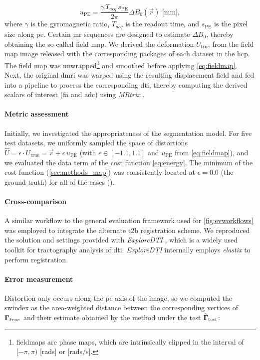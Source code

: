   \begin{equation}
  u_\text{PE} = \frac{\gamma \, T_{acq}\, s_\text{PE}}{2\pi}\Delta B_0(\vec{r})\text{ [mm]},
  \label{eq:fieldmap}
  \end{equation}
where $\gamma$ is the gyromagnetic ratio, $T_{acq}$ is the readout time, and
  $s_\text{PE}$ is the pixel size along \gls*{pe}.
Certain \gls*{mr} sequences are designed to estimate $\Delta B_0$, thereby obtaining
  the so-called field map.
We derived the deformation $U_\text{true}$ from the field map image released with
  the corresponding packages of each dataset in the \gls*{hcp}.
The field map was unwrapped\footnote{fieldmaps are phase maps, which are intrinsically clipped in the interval
  of $[-\pi, \pi)$ [rads] or [rads/s].} and smoothed before applying \eqref{eq:fieldmap}.
Next, the original \gls*{dmri} was warped using the resulting displacement field and fed into
  a pipeline to process the corresponding \gls*{dti}, thereby computing the derived scalars of
  interest (\gls*{fa} and \gls*{adc}) using \emph{MRtrix} \citep{tournier_mrtrix_2012}.

\paragraph*{Metric assessment}
Initially, we investigated the appropriateness of the segmentation model.
For five test datasets, we uniformly sampled the space of distortions
  $\hat{U} = \epsilon \cdot U_\text{true} = \vec{r} + \epsilon \, u_\text{PE}$
  (with $\epsilon \in [-1.1, 1.1]$ and $u_\text{PE}$ from \eqref{eq:fieldmap}),
  and we evaluated the data term of the cost function \eqref{eq:energy}.
The minimum of the cost function (\autoref{sec:methods_map}) was consistently located at
  $\epsilon=0.0$ (the ground-truth) for all of the cases ().

\paragraph*{Cross-comparison}
A similar workflow to the general evaluation framework used for \autoref{fig:evworkflows}
  was employed to integrate the alternate \gls*{t2b} registration scheme.
We reproduced the solution and settings provided with \emph{ExploreDTI}
  \citep{leemans_exploredti_2009}, which is a widely used toolkit for tractography analysis of
  \gls*{dti}.
\emph{ExploreDTI} internally employs \emph{elastix} \citep{klein_elastix_2010} to
  perform registration.

\paragraph*{Error measurement}\label{sec:experiments_evaluation}
Distortion only occurs along the \gls*{pe} axis of the image, so we computed the
  \gls*{swindex} as the area-weighted distance between the corresponding vertices of
  $\boldsymbol{\Gamma}_{true}$ and their estimate obtained by the method under the test $\hat{\boldsymbol{\Gamma}}_\text{test}$:

